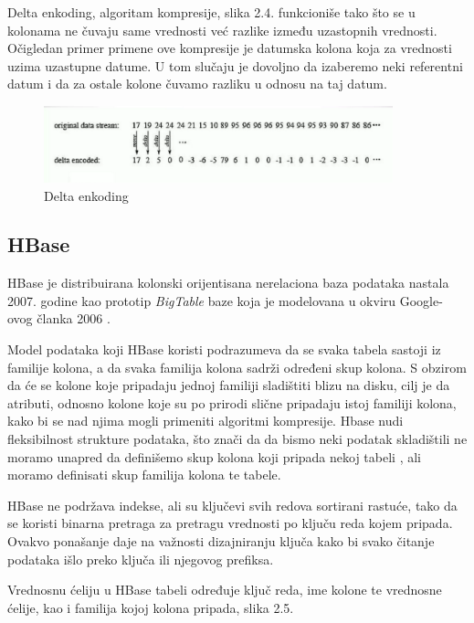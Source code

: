 \documentclass[12pt,oneside]{memoir}
\begin{document}
Delta enkoding, algoritam kompresije, slika 2.4. funkcioniše tako što se u kolonama ne čuvaju same vrednosti već razlike između uzastopnih vrednosti. Očigledan primer primene ove kompresije je datumska kolona koja za vrednosti uzima uzastupne datume. U tom slučaju  je dovoljno da izaberemo neki referentni datum i da za ostale kolone čuvamo razliku u odnosu na taj datum.

\begin{figure}[!ht]
  \centering
  \includegraphics[width=0.9\textwidth]{delta-encoding.png}
  \caption{Delta enkoding}
  \label{fig:grafikon}
\end{figure}

\subsection{HBase}

HBase je distribuirana kolonski orijentisana nerelaciona baza podataka nastala 2007. godine kao prototip \textit{BigTable} baze koja je modelovana u okviru Google-ovog članka 2006 \cite{BigTable}. 

Model podataka koji HBase koristi podrazumeva da se svaka tabela sastoji iz familije kolona, a da svaka familija kolona sadrži određeni skup kolona.  S obzirom da će se kolone koje pripadaju jednoj familiji sladištiti blizu na disku, cilj je da atributi, odnosno kolone koje su po prirodi slične pripadaju istoj familiji kolona, kako bi se nad njima mogli primeniti algoritmi kompresije. Hbase nudi fleksibilnost strukture podataka, što znači da da bismo neki podatak skladištili ne moramo unapred da definišemo skup kolona koji pripada nekoj tabeli , ali moramo definisati skup familija kolona te tabele.

HBase ne podržava indekse, ali su ključevi svih redova sortirani rastuće, tako da se koristi binarna pretraga za pretragu vrednosti po ključu reda kojem pripada. Ovakvo ponašanje daje na važnosti dizajniranju ključa kako bi svako čitanje podataka išlo preko ključa ili njegovog prefiksa. 

Vrednosnu ćeliju u HBase tabeli određuje ključ reda, ime kolone te vrednosne ćelije, kao i familija kojoj kolona pripada, slika 2.5.
\end{document}
